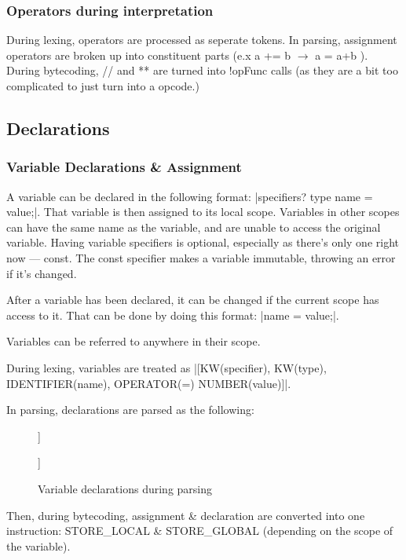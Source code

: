 \documentclass[12pt, letterpaper, oneside]{article}
\begin{document}
	\subsubsection{Operators during interpretation}
	During lexing, operators are processed as seperate tokens. In parsing, assignment operators are broken up into constituent parts (e.x a += b $\rightarrow$ a = a+b ). During bytecoding, // and ** are turned into !opFunc calls (as they are a bit too complicated to just turn into a opcode.)
	\newpage
	\subsection{Declarations}
	\subsubsection{Variable Declarations \& Assignment}
	A variable can be declared in the following format: \spverb|specifiers? type name = value;|. That variable is then assigned to its local scope. Variables in other scopes can have the same name as the variable, and are unable to access the original variable. Having variable specifiers is optional, especially as there's only one right now --- const. The const specifier makes a variable immutable, throwing an error if it's changed.
	
	After a variable has been declared, it can be changed if the current scope has access to it. That can be done by doing this format: \spverb|name = value;|.
	
	Variables can be referred to anywhere in their scope.
	
	During lexing, variables are treated as \spverb|[KW(specifier), KW(type), IDENTIFIER(name), OPERATOR(=) NUMBER(value)]|.
	
	In parsing, declarations are parsed as the following: 
	\begin{figure}[h] 
		\begin{forest}
			[VARDECLARATION
			[Left: Type]
			[Right: name]
			[child0: value]
			]
		\end{forest}
		\begin{forest}
			[ASSIGNMENT
			[Left: Null]
			[Right: name]
			[child0: value]
			]
		\end{forest}
		\caption{Variable declarations during parsing}
		\label{fig:varparse}
	\end{figure}  
	Then, during bytecoding, assignment \& declaration are converted into one instruction: STORE\_LOCAL \& STORE\_GLOBAL (depending on the scope of the variable).
\end{document}

